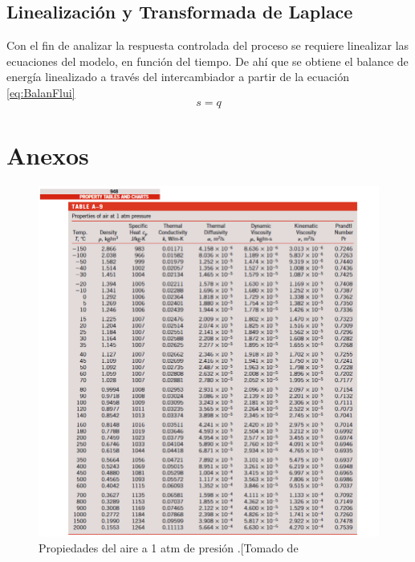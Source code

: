 \documentclass[12pt,letterpaper]{article}     %
\begin{document}
\subsection{Linealización y Transformada de Laplace}
Con el fin de analizar la respuesta controlada del proceso se requiere linealizar las ecuaciones del modelo, en función del tiempo.
De ahí que se obtiene el balance de energía linealizado a través del intercambiador a partir de la ecuación \ref{eq:BalanFlui}
\begin{equation}
 s=q   
\end{equation}


\newpage
\section{Anexos}

\begin{figure}[H]
\centering
\includegraphics[width=1.2\textwidth]{proprtiies1.png}
\caption{Propiedades del aire a 1 atm de presión .[Tomado de \cite[p\ 1006]{yunus}}
\label{fig:propiedadesaire}
\end{figure}
\end{document}
